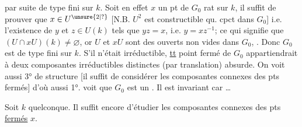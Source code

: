 par suite de type fini sur $k$. Soit en effet
$x$ un pt de $G_0$ rat sur $k$, il suffit de
prouver que $x\in U^{\unsure{2|?}}$ [N.B. $U^2$ est constructible
qu. cpct dans $G_0$] i.e.  l'existence
de $y$ et $z\in U(k)$ tels que $yz=x$, i.e.
$y=xz^{-1}$; ce qui signifie que $(U\cap xU)(k)\ne\varnothing$,
or $U$ et $xU$ sont des ouverts non vides
dans $G_0$, . Donc $G_0$ est de type
fini sur $k$. S'il n'était irréductible, \uline{tt}
point fermé de $G_0$ appartiendrait à  deux composantes irréductibles
distinctes (par translation) absurde. On voit
aussi  3°   de
structure [il suffit de considérer les
composantes connexes des pts fermés]
d'où aussi 1°.  
voit que $G_0$ est un . Il est invariant
car \ldots

 Soit $k$ quelconque.  Il
suffit encore d'étudier les composantes
connexes  des pts \uline{fermés} $x$. 
